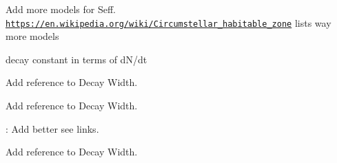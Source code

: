 
\begin{DoxyRefList}
\item[\label{todo__todo000001}%
\Hypertarget{todo__todo000001}%
Namespace \hyperlink{namespace_e_g_x_phys}{E\+G\+X\+Phys} ]Add more models for Seff. \href{https://en.wikipedia.org/wiki/Circumstellar_habitable_zone}{\tt https\+://en.\+wikipedia.\+org/wiki/\+Circumstellar\+\_\+habitable\+\_\+zone} lists way more models 

decay constant in terms of d\+N/dt  
\item[\label{todo__todo000003}%
\Hypertarget{todo__todo000003}%
Module \hyperlink{group___half_life}{Half\+Life} ]Add reference to Decay Width.  
\item[\label{todo__todo000004}%
\Hypertarget{todo__todo000004}%
Module \hyperlink{group___nuclear_binding_energy}{Nuclear\+Binding\+Energy} ]Add reference to Decay Width.  
\item[\label{todo__todo000005}%
\Hypertarget{todo__todo000005}%
File \hyperlink{_nuclear_separation_energy_8hpp}{Nuclear\+Separation\+Energy.hpp} ]\+: Add better see links.  
\item[\label{todo__todo000006}%
\Hypertarget{todo__todo000006}%
Module \hyperlink{group___semi_empirical_mass_formula}{Semi\+Empirical\+Mass\+Formula} ]Add reference to Decay Width. 
\end{DoxyRefList}
